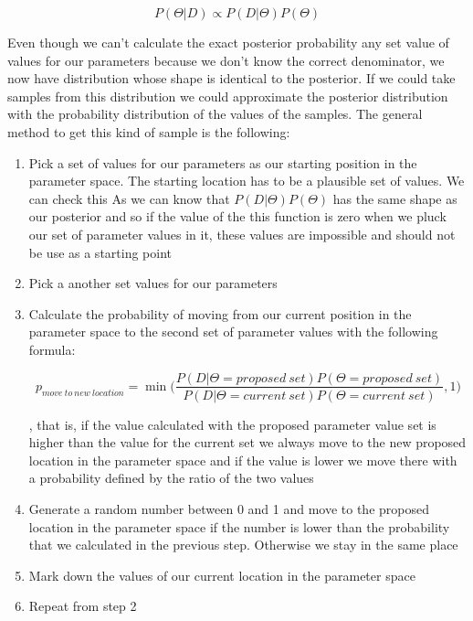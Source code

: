 \documentclass[12pt,a4paper,leqno]{report}
\theoremstyle{plain}
\theoremstyle{definition}
\theoremstyle{remark}
\begin{document}
\begin{def}\label{bayespropto}
    \begin{equation}
        P(\Theta|D) \propto P(D|\Theta)P(\Theta)
    \end{equation}
\end{def}

Even though we can't calculate the exact posterior probability any set value of values for
our parameters because we don't know the correct denominator, we now have distribution whose shape
is identical to the posterior. If we could take samples from this distribution we could
approximate the posterior distribution with the probability distribution of the values of the samples.
The general method to get this kind of sample is the following:

\begin{enumerate}
    \item Pick a set of values for our parameters as our starting position in the parameter space. The starting
          location has to be a plausible set of values. We can check this As we can know
          that \(P(D|\Theta)P(\Theta)\) has the same shape as our posterior and so if the value of the this function is zero when
          we pluck our set of parameter values in it, these values are impossible and should not be use as a starting point
    \item Pick a another set values for our parameters
    \item Calculate the probability of moving from our current position in the parameter space to the second set of parameter
          values with the following formula:

          \begin{def}\label{randomwalk}
              \begin{equation}
                  p_{move\ to\ new\ location} = \min \bigg(\frac{P(D|\Theta = proposed\ set)P(\Theta = proposed\ set)}{P(D|\Theta = current\ set)P(\Theta = current\ set)}, 1 \bigg)
              \end{equation}
          \end{def}
          , that is, if the value calculated with the proposed parameter value set is higher than the value for the current set
          we always move to the new proposed location in the parameter space and if the value is lower we move there
          with a probability defined by the ratio of the two values

    \item Generate a random number between 0 and 1 and move to the proposed location
          in the parameter space if the number is lower than the probability that we calculated
          in the previous step. Otherwise we stay in the same place
    \item Mark down the values of our current location in the parameter space
    \item Repeat from step 2

\end{enumerate}
\end{document}
